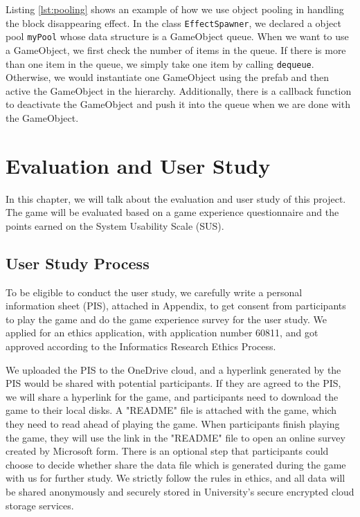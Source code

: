 \documentclass[msc,deptreport,ai]{infthesis}      %
\begin{document}
Listing \ref{lst:pooling} shows an example of how we use object pooling in handling the block disappearing effect. In the class \texttt{EffectSpawner}, we declared a object pool \texttt{myPool} whose data structure is a GameObject queue. When we want to use a GameObject, we first check the number of items in the queue. If there is more than one item in the queue, we simply take one item by calling \texttt{dequeue}. Otherwise, we would instantiate one GameObject using the prefab and then active the GameObject in the hierarchy. Additionally, there is a callback function to deactivate the GameObject and push it into the queue when we are done with the GameObject.

\chapter{Evaluation and User Study}

In this chapter, we will talk about the evaluation and user study of this project. The game will be evaluated based on a game experience questionnaire and the points earned on the System Usability Scale (SUS).

\section{User Study Process}

To be eligible to conduct the user study, we carefully write a personal information sheet (PIS), attached in Appendix, to get consent from participants to play the game and do the game experience survey for the user study. We applied for an ethics application, with application number 60811, and got approved according to the Informatics Research Ethics Process.

We uploaded the PIS to the OneDrive cloud, and a hyperlink generated by the PIS would be shared with potential participants. If they are agreed to the PIS, we will share a hyperlink for the game, and participants need to download the game to their local disks. A "README" file is attached with the game, which they need to read ahead of playing the game. When participants finish playing the game, they will use the link in the "README" file to open an online survey created by Microsoft form. There is an optional step that participants could choose to decide whether share the data file which is generated during the game with us for further study. We strictly follow the rules in ethics, and all data will be shared anonymously and securely stored in University's secure encrypted cloud storage services.
\end{document}

